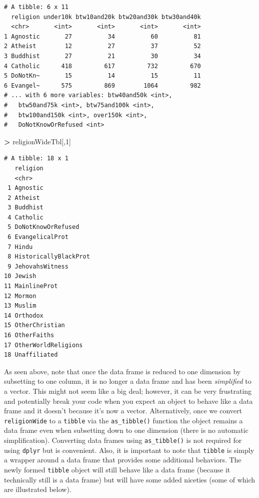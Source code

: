 \documentclass[
]{krantz}
\makeatletter
\newenvironment{Shaded}{\begin{snugshade}}{\end{snugshade}}
\newcommand{\DecValTok}[1]{\textcolor[rgb]{0.06,0.06,0.06}{#1}}
\newcommand{\NormalTok}[1]{#1}
\newcommand{\OperatorTok}[1]{\textcolor[rgb]{0.43,0.43,0.43}{\textbf{#1}}}
\newcommand{\StringTok}[1]{\textcolor[rgb]{0.5,0.5,0.5}{#1}}
\newenvironment{kframe}{%
\medskip{}
\setlength{\fboxsep}{.8em}
 \def\at@end@of@kframe{}%
 \ifinner\ifhmode%
  \def\at@end@of@kframe{\end{minipage}}%
  \begin{minipage}{\columnwidth}%
 \fi\fi%
 \def\FrameCommand##1{\hskip\@totalleftmargin \hskip-\fboxsep
 \colorbox{shadecolor}{##1}\hskip-\fboxsep
     \hskip-\linewidth \hskip-\@totalleftmargin \hskip\columnwidth}%
 \MakeFramed {\advance\hsize-\width
   \@totalleftmargin\z@ \linewidth\hsize
   \@setminipage}}%
 {\par\unskip\endMakeFramed%
 \at@end@of@kframe}
\renewenvironment{Shaded}{\begin{kframe}}{\end{kframe}}
\makeatother
\begin{document}
\begin{verbatim}
# A tibble: 6 x 11
  religion under10k btw10and20k btw20and30k btw30and40k
  <chr>       <int>       <int>       <int>       <int>
1 Agnostic       27          34          60          81
2 Atheist        12          27          37          52
3 Buddhist       27          21          30          34
4 Catholic      418         617         732         670
5 DoNotKn~       15          14          15          11
6 Evangel~      575         869        1064         982
# ... with 6 more variables: btw40and50k <int>,
#   btw50and75k <int>, btw75and100k <int>,
#   btw100and150k <int>, over150k <int>,
#   DoNotKnowOrRefused <int>
\end{verbatim}

\begin{Shaded}
\begin{Highlighting}[]
\OperatorTok{\textgreater{}}\StringTok{ }\NormalTok{religionWideTbl[,}\DecValTok{1}\NormalTok{]}
\end{Highlighting}
\end{Shaded}

\begin{verbatim}
# A tibble: 18 x 1
   religion             
   <chr>                
 1 Agnostic             
 2 Atheist              
 3 Buddhist             
 4 Catholic             
 5 DoNotKnowOrRefused   
 6 EvangelicalProt      
 7 Hindu                
 8 HistoricallyBlackProt
 9 JehovahsWitness      
10 Jewish               
11 MainlineProt         
12 Mormon               
13 Muslim               
14 Orthodox             
15 OtherChristian       
16 OtherFaiths          
17 OtherWorldReligions  
18 Unaffiliated         
\end{verbatim}

As seen above, note that once the data frame is reduced to one dimension by subsetting to one column, it is no longer a data frame and has been \emph{simplified} to a vector. This might not seem like a big deal; however, it can be very frustrating and potentially break your code when you expect an object to behave like a data frame and it doesn't because it's now a vector. Alternatively, once we convert \texttt{religionWide} to a \texttt{tibble} via the \texttt{as\_tibble()} function the object remains a data frame even when subsetting down to one dimension (there is no automatic simplification). Converting data frames using \texttt{as\_tibble()} is not required for using \texttt{dplyr} but is convenient. Also, it is important to note that \texttt{tibble} is simply a wrapper around a data frame that provides some additional behaviors. The newly formed \texttt{tibble} object will still behave like a data frame (because it technically still is a data frame) but will have some added niceties (some of which are illustrated below).
\end{document}
